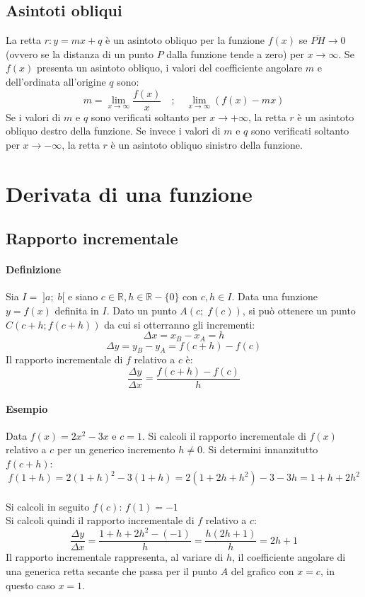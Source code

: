 \documentclass[a4paper,14pt]{extarticle}
\newcommand{\R}{\mathbb{R}}
\begin{document}
\subsection{Asintoti obliqui}
La retta $r: y = mx + q$ è un asintoto obliquo per la funzione $f(x)$ se $\overline{PH} \to 0$ (ovvero se la distanza di un punto $P$ dalla funzione tende a zero) per $x \to \infty$. Se $f(x)$ presenta un asintoto obliquo, i valori del coefficiente angolare $m$ e dell'ordinata all'origine $q$ sono: \large \[ m = \lim_{x \to \infty} \frac{f(x)}{x} \quad; \quad \lim_{x \to \infty} (f(x) - mx) \] \normalsize
Se i valori di $m$ e $q$ sono verificati soltanto per $x \to +\infty$, la retta $r$ è un asintoto obliquo destro della funzione. Se invece i valori di $m$ e $q$ sono verificati soltanto per $x \to -\infty$, la retta $r$ è un asintoto obliquo sinistro della funzione.

\section{Derivata di una funzione}
\subsection{Rapporto incrementale}
\paragraph{Definizione\\}
Sia $I = \;]a;\;b[$ e siano $c \in\R, h \in\R-\{0\}$ con $c,h \in I$. Data una funzione $y= f(x)$ definita in $I$. Dato un punto $A(c;\;f(c))$, si può ottenere un punto $C(c+h; f(c+h))$ da cui si otterranno gli incrementi: \large \[ \Delta x = x_B - x_A = h\] \[ \Delta y = y_B - y_A = f(c+h)-f(c)\] \normalsize
Il rapporto incrementale di $f$ relativo a $c$ è: \large \[ \frac{\Delta y}{\Delta x} = \frac{f(c+h)-f(c)}{h}\] \normalsize

\paragraph{Esempio \\}
Data $f(x) = 2x^2-3x$ e $c = 1$. Si calcoli il rapporto incrementale di $f(x)$ relativo a $c$ per un generico incremento $h\neq0$. Si determini innanzitutto $ f(c + h)$: \[ f(1 + h) = 2(1 + h)^2-3(1+h)=2(1+2h+h^2)-3-3h = 1+h+2h^2\] \\ Si calcoli in seguito $f(c)$: $f(1) = -1$ \\ Si calcoli quindi il rapporto incrementale di $f$ relativo a $c$: \large \[ \frac{\Delta y}{\Delta x} = \frac{1+h+2h^2-(-1)}{h} = \frac{h(2h+1)}{h} = 2h+1\] \normalsize
Il rapporto incrementale rappresenta, al variare di $h$, il coefficiente angolare di una generica retta secante che passa per il punto $A$ del grafico con $x=c$, in questo caso $x=1$.
\end{document}
